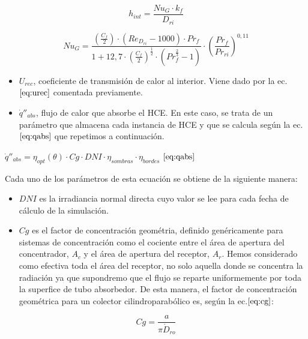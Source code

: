 \documentclass[11pt]{article}
\begin{document}
\begin{equation}
    h_{int} = \frac{Nu_{G}\cdot k_f }{D_{ri}}
    \label{eq:hint}
\end{equation}

\begin{equation}
    Nu_{G} = \frac{ \left( \frac{C_f}{2} \right)\cdot\left( Re_{D_{ri}} - 1000 \right)\cdot Pr_f }{1 + 12,7 \cdot \left(\frac{C_f}{2} \right)^{\frac{1}{2}}\cdot \left(Pr^{\frac{2}{3}}_f -1 \right)} \cdot \left( \frac{Pr_f}{Pr_{ri}} \right)^{0,11}
    \label{eq:nug}
\end{equation}

\begin{itemize}
\item
  \(U_{rec}\), coeficiente de transmisión de calor al interior. Viene
  dado por la ec.\(\eqref{eq:urec}\) comentada previamente.
\item
  \(\dot q''_{abs}\), flujo de calor que absorbe el HCE. En este caso,
  se trata de un parámetro que almacena cada instancia de HCE y que se
  calcula según la ec.\(\eqref{eq:qabs}\) que repetimos a continuación.
\end{itemize}

\(\dot q''_{abs}= \eta_{opt}(\theta) \cdot Cg \cdot DNI \cdot \eta_{sombras} \cdot \eta_{bordes}\)
\(\eqref{eq:qabs}\)

Cada uno de los parámetros de esta ecuación se obtiene de la siguiente
manera:

\begin{itemize}
\item
  \(DNI\) es la irradiancia normal directa cuyo valor se lee para cada
  fecha de cálculo de la simulación.
\item
  \(Cg\) es el factor de concentración geométria, definido genéricamente
  para sistemas de concentración como el cociente entre el área de
  apertura del concentrador, \(A_c\) y el área de apertura del receptor,
  \(A_r\). Hemos considerado como efectiva toda el área del receptor, no
  solo aquella donde se concentra la radiación ya que supondremo que el
  flujo se reparte uniformemente por toda la superfice de tubo
  absorbedor. De esta manera, el factor de concentración geométrica para
  un colector cilindroparabólico es, según la ec.\(\eqref{eq:cg}\):
\end{itemize}

\begin{equation}
   Cg = \frac{a}{\pi \dot D_{ro}}
    \label{eq:cg}
\end{equation}
\end{document}
